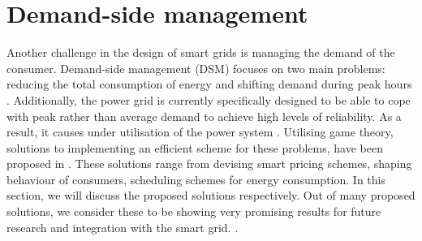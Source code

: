 \section{Demand-side management}
Another challenge in the design of smart grids is managing the demand of the consumer. Demand-side management (DSM) focuses on two main problems: reducing the total consumption of energy and shifting demand during peak hours \cite{keypaper}. Additionally, the power grid is currently specifically designed to be able to cope with peak rather than average demand to achieve high levels of reliability. As a result, it causes under utilisation of the power system \cite{MaDengSongEtAl2014}. Utilising game theory, solutions to implementing an efficient scheme for these problems, have been proposed in \cite{SamadiMohsenian-RadSchoberEtAl2012, SamadiSchoberWong2011, MaDengSongEtAl2014, MaharjanZhuZhangEtAl2013, ChenKishoreSnyder2011, ChenLiLowEtAl2010, Mohsenian-RadWongJatskevichEtAl2010a, SalinasLiLi2013, CaronKesidis2010, DepuruWangDevabhaktuni2011a}. These solutions range from devising smart pricing schemes, shaping behaviour of consumers, scheduling schemes for energy consumption. In this section, we will discuss the proposed solutions respectively. Out of many proposed solutions, we consider these to be showing very promising results for future research and integration with the smart grid. .

